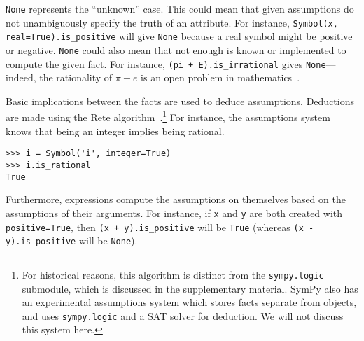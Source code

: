 \texttt{None} represents the ``unknown'' case. This could mean that given
assumptions do not unambiguously specify the truth of an attribute. For
instance, \texttt{Symbol(\textquotesingle{}x\textquotesingle{},
  real=True).is\_positive} will give \texttt{None} because a real symbol might
be positive or negative. \texttt{None} could also mean that not enough is
known or implemented to compute the given fact. For instance, \texttt{(pi +
  E).is\_irrational} gives \texttt{None}---indeed, the rationality of
$\pi + e$ is an open problem in mathematics~\cite{lang1966introduction}.

Basic implications between the facts are used to deduce assumptions.
Deductions are made using the Rete
algorithm~\cite{doorenbos1995production}.\footnote{\label{note:assumptions}For historical reasons,
  this algorithm is distinct from the \texttt{sympy.logic} submodule, which is
  discussed in the supplementary material. SymPy also has an experimental
  assumptions system which stores facts separate from objects, and uses
  \texttt{sympy.logic} and a SAT solver for deduction. We will not discuss
  this system here.} For instance, the assumptions system knows that being an
integer implies being rational.
\begin{verbatim}
>>> i = Symbol('i', integer=True)
>>> i.is_rational
True
\end{verbatim}
Furthermore, expressions compute the assumptions on themselves
based on the assumptions of their arguments. For instance, if \texttt{x} and
\texttt{y} are both created with \texttt{positive=True}, then
\texttt{(x + y).is\_positive} will be \texttt{True} (whereas
\texttt{(x - y).is\_positive} will be \texttt{None}).
